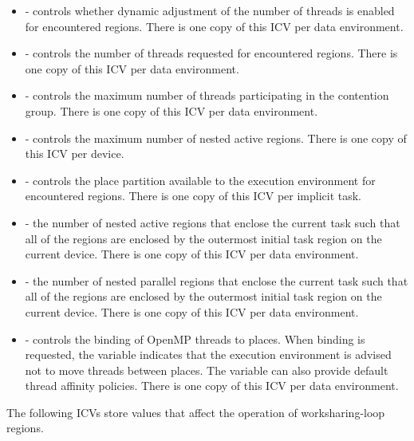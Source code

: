 \begin{itemize}
\item {} - controls whether dynamic adjustment of the number of threads 
      is enabled for encountered  regions. There is one copy of this 
      ICV per data environment.

\item {} - controls the number of threads requested for encountered 
       regions. There is one copy of this ICV per data environment.

\item {} - controls the maximum number of threads participating 
      in the contention group. There is one copy of this ICV per data environment.

\item {} - controls the maximum number of nested active 
       regions. There is one copy of this ICV per device.

\item {} - controls the place partition available to the 
      execution environment for encountered  regions. There is one 
      copy of this ICV per implicit task.

\item {} - the number of nested active  regions 
      that enclose the current task such that all of the  regions are 
      enclosed by the outermost initial task region on the current device. There is 
      one copy of this ICV per data environment.

\item {} - the number of nested parallel regions that enclose the 
      current task such that all of the  regions are enclosed by the 
      outermost initial task region on the current device. There is one copy of this 
      ICV per data environment.

\item {} - controls the binding of OpenMP threads to places. When binding 
      is requested, the variable indicates that the execution environment is advised 
      not to move threads between places. The variable can also provide default thread 
      affinity policies. There is one copy of this ICV per data environment.
\end{itemize}

The following ICVs store values that affect the operation of worksharing-loop regions.

